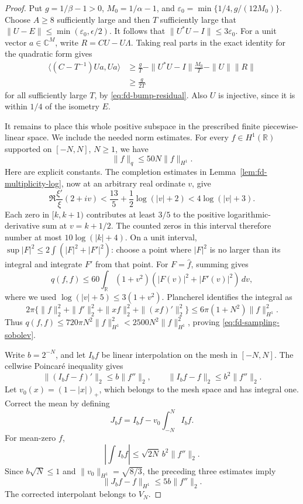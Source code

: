 \begin{proof}
Put \(g=1/\beta-1>0\), \(M_0=1/\alpha-1\), and
\(\varepsilon_0=\min\{1/4,g/(12M_0)\}\).
Choose \(A\ge8\) sufficiently large and then \(T\) sufficiently
large that \(\|U-E\|\le\min(\varepsilon_0,\epsilon/2)\).
It follows that
\(\|U^*U-I\|\le3\varepsilon_0\).
For a unit vector \(a\in\mathbb C^M\), write
\(R=CU-U\Lambda\). Taking real parts in the exact identity
for the quadratic form gives
\begin{align*}
 \langle(C-T^{-1})Ua,Ua\rangle
 &\ge\frac gT-
       \|U^*U-I\|\frac{M_0}{T}-\|U\|\|R\|\\
 &\ge\frac{g}{2T}
\end{align*}
for all sufficiently large \(T\), by
\eqref{eq:fd-bump-residual}. Also \(U\) is injective, since it
is within \(1/4\) of the isometry \(E\).

It remains to place this whole positive subspace in the prescribed
finite piecewise-linear space. We include the needed norm estimates.
For every \(f\in H^1(\mathbb R)\) supported on \([-N,N]\),
\(N\ge1\), we have
\begin{equation}\label{eq:fd-sampling-sobolev}
 \|f\|_q\le50N\|f\|_{H^1}.
\end{equation}
Here are explicit constants. The completion estimates in
Lemma~\ref{lem:fd-multiplicity-log}, now at an arbitrary real ordinate
\(v\), give
\[
 \Re\frac{\xi'}{\xi}(2+iv)
 <\frac{13}{5}+\frac12\log(|v|+2)
 <4\log(|v|+3).
\]
Each zero in \([k,k+1)\) contributes at least \(3/5\) to the
positive logarithmic-derivative sum at \(v=k+1/2\). The counted
zeros in this interval therefore number at most
\(10\log(|k|+4)\). On a unit interval,
\(\sup|F|^2\le2\int(|F|^2+|F'|^2)\): choose a point where
\(|F|^2\) is no larger than its integral and integrate \(F'\)
from that point. For \(F=\widehat f\), summing gives
\[
 q(f,f)\le60\int_{\mathbb R}(1+v^2)
                   (|F(v)|^2+|F'(v)|^2)\,dv,
\]
where we used \(\log(|v|+5)\le3(1+v^2)\).
Plancherel identifies the integral as
\[
 2\pi\{\|f\|_2^2+\|f'\|_2^2+
                  \|xf\|_2^2+\|(xf)'\|_2^2\}
 \le6\pi(1+N^2)\|f\|_{H^1}^2.
\]
Thus \(q(f,f)\le720\pi N^2\|f\|_{H^1}^2
<2500N^2\|f\|_{H^1}^2\), proving
\eqref{eq:fd-sampling-sobolev}.

Write \(b=2^{-N}\), and let \(I_b f\) be linear interpolation
on the mesh in \([-N,N]\). The cellwise Poincar\'e inequality gives
\[
 \|(I_bf-f)'\|_2\le b\|f''\|_2,\qquad
 \|I_bf-f\|_2\le b^2\|f''\|_2.
\]
Let \(v_0(x)=(1-|x|)_+\), which belongs to the mesh space and
has integral one. Correct the mean by defining
\[
 J_bf=I_bf-v_0\int_{-N}^{N}I_bf.
\]
For mean-zero \(f\),
\[
 \left|\int I_bf\right|\le\sqrt{2N}\,b^2\|f''\|_2.
\]
Since \(b\sqrt N\le1\) and
\(\|v_0\|_{H^1}=\sqrt{8/3}\), the preceding three estimates imply
\begin{equation}\label{eq:fd-interpolation-h1}
 \|J_bf-f\|_{H^1}\le5b\|f''\|_2.
\end{equation}
The corrected interpolant belongs to \(V_N\).


\end{proof}
